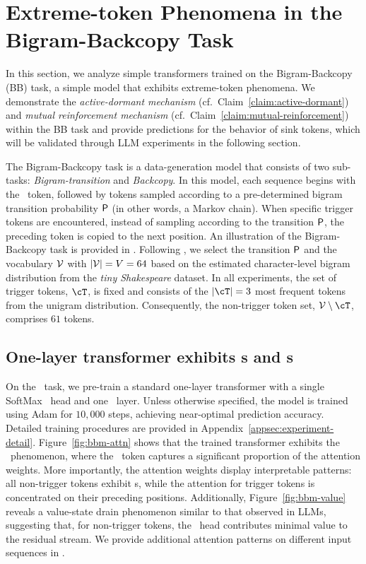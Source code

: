 \section{Extreme-token Phenomena in the Bigram-Backcopy Task}\label{sec:bb_task}


In this section, we analyze simple transformers trained on the Bigram-Backcopy (BB) task, a simple model that exhibits extreme-token phenomena. We demonstrate the \textit{active-dormant mechanism} (cf.\ Claim~\ref{claim:active-dormant}) and \textit{mutual reinforcement mechanism} (cf.\ Claim~\ref{claim:mutual-reinforcement}) within the BB task and provide predictions for the behavior of sink tokens, which will be validated through LLM experiments in the following section. 

The Bigram-Backcopy task is a data-generation model that consists of two sub-tasks: \textit{Bigram-transition} and \textit{Backcopy}. In this model, each sequence begins with the \bos~token, followed by tokens sampled according to a pre-determined bigram transition probability ${\sf P}$ (in other words, a Markov chain). When specific trigger tokens are encountered, instead of sampling according to the transition ${\sf P}$, the preceding token is copied to the next position. An illustration of the Bigram-Backcopy task is provided in . Following \citet{bietti2024birth}, we select the transition ${\sf P}$ and the vocabulary $\mathcal{V}$ with $| \mathcal{V} | = V = 64$ based on the estimated character-level bigram distribution from the \textit{tiny Shakespeare} dataset. In all experiments, the set of trigger tokens, $\cT$, is fixed and consists of the $\abs{\cT}=3$ most frequent tokens from the unigram distribution. Consequently, the non-trigger token set, $\vocab\setminus \cT$, comprises $61$ tokens.

\subsection{One-layer transformer exhibits \attnsink s and  s}

On the \bb~task, we pre-train a standard one-layer transformer with a single SoftMax \attn~head and one \mlp~layer. Unless otherwise specified, the model is trained using Adam for $10,000$ steps, achieving near-optimal prediction accuracy. Detailed training procedures are provided in Appendix~\ref{appsec:experiment-detail}. Figure~\ref{fig:bbm-attn} shows that the trained transformer exhibits the \attnsink~phenomenon, where the \bos~token captures a significant proportion of the attention weights. More importantly, the attention weights display interpretable patterns: all non-trigger tokens exhibit \attnsink s, while the attention for trigger tokens is concentrated on their preceding positions. Additionally, Figure~\ref{fig:bbm-value} reveals a value-state drain phenomenon similar to that observed in LLMs, suggesting that, for non-trigger tokens, the \attn~head contributes minimal value to the residual stream. We provide additional attention patterns on different input sequences in .

